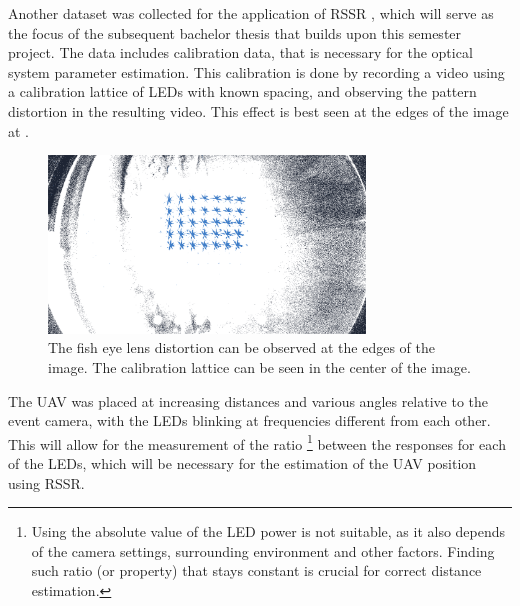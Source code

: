 Another dataset was collected for the application of \ac{RSSR} \cite{jung2014rssr},
which will serve as the focus of the subsequent bachelor thesis that builds upon this semester project.
The data includes calibration data, that is necessary for the optical system parameter estimation. This calibration is done by
recording a video using a calibration lattice of LEDs with known spacing, and observing the pattern distortion in the
resulting video. This effect is best seen at the edges of the image at .
\begin{figure}[H]
	\centering
	\includegraphics[width=0.75\textwidth]{./fig/photos/calibration.png}
	\caption{The fish eye lens distortion can be observed at the edges of the image. The calibration lattice can be seen in the center of the image.}
	\label{fig:calibation}
  \end{figure}
The UAV was placed at increasing distances and various angles relative to the event camera, with the LEDs blinking at frequencies different from
each other. This will allow for the measurement of the ratio
\footnote{Using the absolute value of the LED power is not suitable, as it also depends of the camera settings, surrounding
environment and other factors. Finding such ratio (or property) that stays constant is crucial for correct distance estimation.}
between the responses for each of the LEDs, which will be necessary
for the estimation of the UAV position using RSSR.